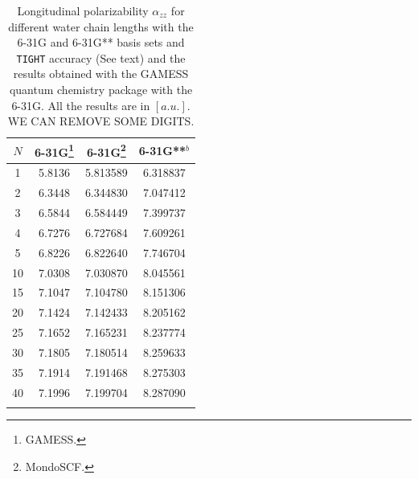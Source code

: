 \documentclass[prl,aps,twocolumn,showpacs,twocolumngrid,superbib]{revtex4}
\begin{document}
\begin{table}[t]
  \centering
  \caption{\protect
    Longitudinal polarizability $\alpha_{zz}$
    for different water chain lengths with the 6-31G and 6-31G** basis sets
    and {\tt TIGHT} accuracy (See text) and the results obtained with
    the GAMESS quantum chemistry package \cite{gamess} with the 6-31G. 
    All the results are in $[a.u.]$.
    WE CAN REMOVE SOME DIGITS.
  }\label{tab:Alpha_1D_Values}
  \begin{tabular}{cccc}
    \toprule
    $N$ &\multicolumn{1}{c}{6-31G\footnote[1]{\sc GAMESS.}}
        &\multicolumn{1}{c}{6-31G\footnote[2]{\sc MondoSCF.}}
        &\multicolumn{1}{c}{6-31G**$^b$}\\
    \hline
     1 & 5.8136 & 5.813589 & 6.318837     \\
     2 & 6.3448 & 6.344830 & 7.047412     \\
     3 & 6.5844 & 6.584449 & 7.399737     \\
     4 & 6.7276 & 6.727684 & 7.609261     \\
     5 & 6.8226 & 6.822640 & 7.746704     \\
    10 & 7.0308 & 7.030870 & 8.045561     \\
    15 & 7.1047 & 7.104780 & 8.151306     \\
    20 & 7.1424 & 7.142433 & 8.205162     \\
    25 & 7.1652 & 7.165231 & 8.237774     \\
    30 & 7.1805 & 7.180514 & 8.259633     \\
    35 & 7.1914 & 7.191468 & 8.275303     \\
    40 & 7.1996 & 7.199704 & 8.287090     \\
    \botrule
  \end{tabular}
\end{table}
\end{document}
